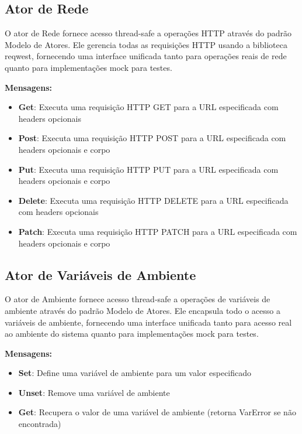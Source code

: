 \subsection{Ator de Rede}

O ator de Rede fornece acesso thread-safe a operações HTTP através do padrão Modelo de Atores. Ele gerencia todas as requisições HTTP usando a biblioteca reqwest, fornecendo uma interface unificada tanto para operações reais de rede quanto para implementações mock para testes.

\textbf{Mensagens:}

\begin{itemize}
    \item \textbf{Get}: Executa uma requisição HTTP GET para a URL especificada com headers opcionais
    \item \textbf{Post}: Executa uma requisição HTTP POST para a URL especificada com headers opcionais e corpo
    \item \textbf{Put}: Executa uma requisição HTTP PUT para a URL especificada com headers opcionais e corpo
    \item \textbf{Delete}: Executa uma requisição HTTP DELETE para a URL especificada com headers opcionais
    \item \textbf{Patch}: Executa uma requisição HTTP PATCH para a URL especificada com headers opcionais e corpo
\end{itemize}

\subsection{Ator de Variáveis de Ambiente}

O ator de Ambiente fornece acesso thread-safe a operações de variáveis de ambiente através do padrão Modelo de Atores. Ele encapsula todo o acesso a variáveis de ambiente, fornecendo uma interface unificada tanto para acesso real ao ambiente do sistema quanto para implementações mock para testes.

\textbf{Mensagens:}

\begin{itemize}
    \item \textbf{Set}: Define uma variável de ambiente para um valor especificado
    \item \textbf{Unset}: Remove uma variável de ambiente
    \item \textbf{Get}: Recupera o valor de uma variável de ambiente (retorna VarError se não encontrada)
\end{itemize}

